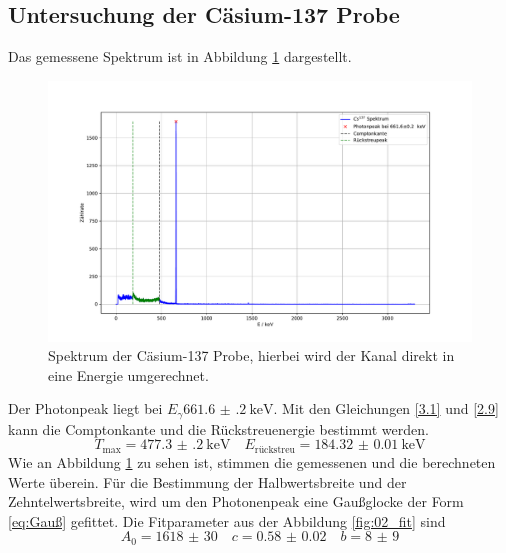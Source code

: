 \subsection{Untersuchung der Cäsium-137 Probe}
Das gemessene Spektrum ist in Abbildung \ref{fig:Cs137} dargestellt.
\FloatBarrier
\begin{figure}
  \centering
  \caption{Spektrum der Cäsium-137 Probe, hierbei wird der Kanal direkt in eine Energie umgerechnet.}
  \label{fig:Cs137}
  \includegraphics[width= \textwidth,keepaspectratio]{figure/02_peaks.pdf}
\end{figure}
\FloatBarrier
Der Photonpeak liegt bei $E_{\gamma}\SI{661.6(2)}{\kilo\eV}$. Mit den Gleichungen \eqref{3.1} und \eqref{2.9} kann 
die Comptonkante und die Rückstreuenergie bestimmt werden.
\begin{equation*}
  T_{\text{max}} = \SI{477.3(2)}{\kilo\eV} \quad E_{\text{rückstreu}} = \SI{184.32(1)}{\kilo\eV}
\end{equation*}
Wie an Abbildung \ref{fig:Cs137} zu sehen ist, stimmen die gemessenen und die berechneten Werte überein.
Für die Bestimmung der Halbwertsbreite und der Zehntelwertsbreite, wird um den Photonenpeak eine Gaußglocke der Form 
\eqref{eq:Gauß} gefittet.
Die Fitparameter aus der Abbildung \ref{fig:02_fit} sind 
\begin{equation*}
  A_0 = \num{1618(30)}\quad c = \num{0.58(2)} \quad b = \num{8(9)}
\end{equation*}
\FloatBarrier
